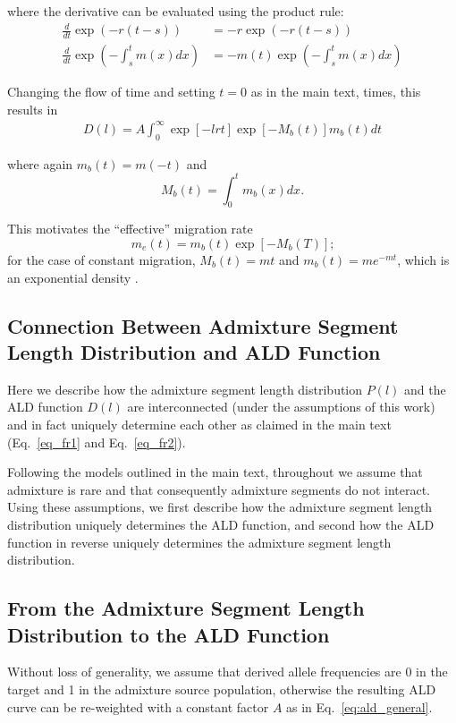 \documentclass[11pt]{article}
\begin{document}
where the derivative can be evaluated using the product rule:
\begin{align}
    \frac{d}{dt}\exp\left(-r(t-s)\right) & =  -r\exp(-r(t-s)) \nonumber\\
    \frac{d}{dt}\exp\left(-\int_{s}^tm(x)dx\right) &=
    -m(t)\exp\left(-\int_{s}^tm(x)dx\right)\nonumber
\end{align}

Changing the flow of time and setting $t=0$ as in the main text, times,  this results in
\begin{align}
    D(l) = A\int_0^\infty \exp[-lrt] \exp[-M_b(t)] m_b(t) dt
\end{align}

where again $m_b(t) = m(-t)$ and $$M_b(t) = \int_0^t m_b(x)dx\text{.}$$

This motivates the ``effective'' migration rate $$m_e(t) = m_b(t) \exp[-M_b(T)]\text{;}$$ for the 
case of constant migration, $M_b(t) = mt$ and $m_b(t)= m e^{-mt}$, which is an exponential density  \citep{pool_inference_2009}.


\subsection{Connection Between Admixture Segment Length Distribution and ALD Function}
\label{app:connection}
Here we describe how the admixture segment length distribution $P(l)$ and the ALD function $D(l)$ are interconnected (under the assumptions of this work) and in fact uniquely determine each other as claimed in the main text (Eq.~\ref{eq_fr1} and Eq.~\ref{eq_fr2}).

Following the models outlined in the main text, throughout we assume that admixture is rare and that consequently admixture segments do not interact. Using these assumptions, we first describe how the admixture segment length distribution uniquely determines the ALD function, and second how the ALD function in reverse uniquely determines the admixture segment length distribution.

\subsection{From the Admixture Segment Length Distribution to the ALD Function}
Without loss of generality, we assume that derived allele frequencies are 0 in the target and 1 in the admixture source population, otherwise the resulting ALD curve can be re-weighted with a constant factor $A$ as in Eq.~\ref{eq:ald_general}.
\end{document}
